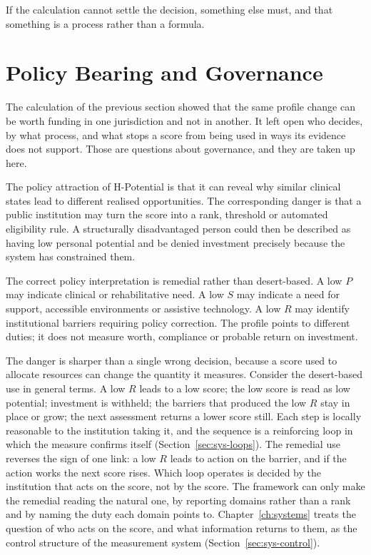 If the calculation cannot settle the decision, something else must, and that
something is a process rather than a formula.

\section{Policy Bearing and Governance}
\label{sec:lit-policy}

The calculation of the previous section showed that the same profile change can be worth funding in one jurisdiction and not in another. It left open who decides, by what process, and what stops a score from being used in ways its evidence does not support. Those are questions about governance, and they are taken up here.

The policy attraction of H-Potential is that it can reveal why similar clinical
states lead to different realised opportunities. The corresponding danger is
that a public institution may turn the score into a rank, threshold or automated
eligibility rule. A structurally disadvantaged person could then be described
as having low personal potential and be denied investment precisely because the
system has constrained them.

The correct policy interpretation is remedial rather than desert-based. A low
$P$ may indicate clinical or rehabilitative need. A low $S$ may indicate a need
for support, accessible environments or assistive technology. A low $R$ may
identify institutional barriers requiring policy correction. The profile points
to different duties; it does not measure worth, compliance or probable return
on investment.

The danger is sharper than a single wrong decision, because a score used to
allocate resources can change the quantity it measures. Consider the
desert-based use in general terms. A low $R$ leads to a low score; the low
score is read as low potential; investment is withheld; the barriers that
produced the low $R$ stay in place or grow; the next assessment returns a
lower score still. Each step is locally reasonable to the institution taking
it, and the sequence is a reinforcing loop in which the measure confirms
itself (Section~\ref{sec:sys-loops}). The remedial use reverses the sign of
one link: a low $R$ leads to action on the barrier, and if the action works
the next score rises. Which loop operates is decided by the institution that
acts on the score, not by the score. The framework can only make the remedial
reading the natural one, by reporting domains rather than a rank and by naming
the duty each domain points to. Chapter~\ref{ch:systems} treats the question
of who acts on the score, and what information returns to them, as the
control structure of the measurement system (Section~\ref{sec:sys-control}).

